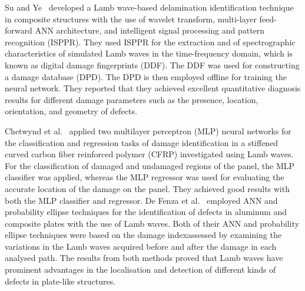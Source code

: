 Su and Ye~\cite{Su2004a} developed a Lamb wave-based delamination identification technique in composite structures with the use of wavelet transform, multi-layer feed-forward ANN architecture, and intelligent signal processing and pattern recognition (ISPPR).
They used ISPPR for the extraction and \DIFdelbegin {}\DIFdelend \DIFaddbegin {}\DIFaddend of spectrographic characteristics of simulated Lamb waves in the time-frequency domain, which is known as digital damage fingerprints (DDF).
The DDF was used for constructing a damage \DIFdelbegin {}\DIFdelend \DIFaddbegin {}\DIFaddend database (DPD). 
The DPD is then employed offline for training the neural network.
They reported that they achieved excellent quantitative diagnosis results for different damage parameters such as the presence, location, orientation, and geometry of defects.

Chetwynd et al.~\cite{chetwynd2008damage} applied two multilayer perceptron (MLP) neural networks for the classification and regression tasks of damage identification in a stiffened curved carbon fiber reinforced polymer (CFRP) investigated using Lamb waves.
For the classification of damaged and undamaged regions of the panel, the MLP classifier was applied, whereas the MLP regressor was used for evaluating the accurate location of the damage on the panel. 
They achieved \DIFdelbegin {}\DIFdelend good results with both the MLP classifier and \DIFaddbegin {}\DIFaddend regressor.
De Fenza et al.~\cite{de2015application} employed ANN and probability ellipse techniques for the identification of defects in aluminum and composite plates with the use of Lamb waves.
Both of their ANN and probability ellipse techniques were based on the damage index\DIFaddbegin {}\DIFaddend assessed by examining the variations in the Lamb waves acquired before and after the damage in each analysed path.
The results from both methods proved that Lamb waves have prominent advantages in the localisation and detection of different kinds of defects in plate-like structures.

